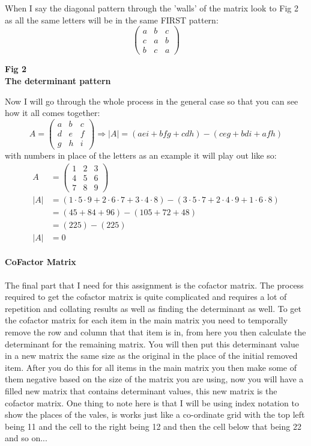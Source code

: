 \documentclass{article}
\begin{document}
When I say the diagonal pattern through the 'walls' of the matrix look to Fig 2 as all the same letters will be in the same FIRST pattern:
\[
	\begin{pmatrix}
		a & b & c\\
		c & a & b\\
		b & c & a
	\end{pmatrix}
\]
\begin{center}
	\small{ \textbf{Fig 2 \\ The determinant pattern}}
\end{center}

Now I will go through the whole process in the general case so that you can see how it all comes together:
\[
	A = 
	\begin{pmatrix}
		a & b & c\\
		d & e & f\\
		g & h & i
	\end{pmatrix}
	\Rightarrow
	|A| = (aei + bfg + cdh) - (ceg + bdi + afh)
\]
with numbers in place of the letters as an example it will play out like so:
\begin{align*}
	A &= 
	\begin{pmatrix}
		1 & 2 & 3\\
		4 & 5 & 6\\
		7 & 8 & 9
	\end{pmatrix}
	\\
	|A| &= (1\cdot5\cdot9+2\cdot6\cdot7+3\cdot4\cdot8) - (3\cdot5\cdot7+2\cdot4\cdot9+1\cdot6\cdot8)
	\\
	&= (45+84+96) - (105+72+48)
	\\
	&= (225) - (225)
	\\
	|A| &= 0
\end{align*}
\paragraph{CoFactor Matrix}
The final part that I need for this assignment is the cofactor matrix. The process required to get the cofactor matrix is quite complicated and requires a lot of repetition and collating results as well as finding the determinant as well. To get the cofactor matrix for each item in the main matrix you need to temporally remove the row and column that that item is in, from here you then calculate the determinant for the remaining matrix. You will then put this determinant value in a new matrix the same size as the original in the place of the initial removed item. After you do this for all items in the main matrix you then make some of them negative based on the size of the matrix you are using, now you will have a filled new matrix that contains determinant values, this new matrix is the cofactor matrix. One thing to note here is that I will be using index notation to show the places of the vales, is works just like a co-ordinate grid with the top left being 11 and the cell to the right being 12 and then the cell below that being 22 and so on...
\end{document}
